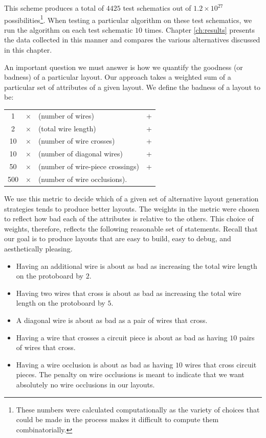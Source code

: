 This scheme produces a total of $4425$ test schematics out of $1.2\times10^{27}$
possibilities\footnote{These numbers were calculated computationally as the
variety of choices that could be made in the process makes it difficult to
compute them combinatorially.}.
When testing a particular algorithm on these test
schematics, we run the algorithm on each test schematic $10$ times. Chapter
\ref{ch:results} presents the data collected in this manner and compares the
various alternatives discussed in this chapter.

An important question we must answer is how we quantify the goodness (or badness)
of a particular layout. Our approach takes a weighted sum of a particular set of
attributes of a given layout. We define the badness of a layout to be:
\begin{table}[H]
\centering
\begin{tabular}{ccll}
1 &$\times$ &(number of wires) &+ \\
2 &$\times$ &(total wire length) &+ \\
10 &$\times$ &(number of wire crosses) &+ \\
10 &$\times$ &(number of diagonal wires) &+ \\
50 &$\times$ &(number of wire-piece crossings) &+ \\
500 &$\times$ &(number of wire occlusions).
\end{tabular}
\end{table}
We use this metric to decide which of a given set of alternative
layout generation strategies tends to produce better layouts.
The weights in the metric were chosen to reflect how
bad each of the attributes is relative to the others. This choice of weights,
therefore, reflects the following reasonable set of statements. Recall that our
goal is to produce layouts that are easy to build, easy to debug, and
aesthetically pleasing.
\begin{itemize}
\item Having an additional wire is about as bad as increasing the total wire
length on the protoboard by $2$.
\item Having two wires that cross is about as bad as increasing the total
wire length on the protoboard by $5$.
\item A diagonal wire is about as bad as a pair of wires that cross.
\item Having a wire that crosses a circuit piece is about as bad as having $10$
pairs of wires that cross.
\item Having a wire occlusion is about as bad as having $10$ wires that cross
circuit pieces. The penalty on wire occlusions is meant to indicate that we want
absolutely no wire occlusions in our layouts.
\end{itemize}
